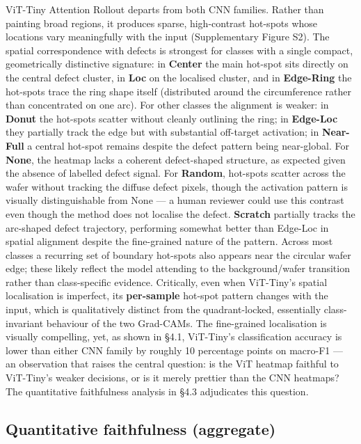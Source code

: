 \documentclass[11pt,a4paper]{article}
\begin{document}
ViT-Tiny Attention Rollout departs from both CNN families. Rather than painting broad regions, it produces sparse, high-contrast hot-spots whose locations vary meaningfully with the input (Supplementary Figure S2). The spatial correspondence with defects is strongest for classes with a single compact, geometrically distinctive signature: in \textbf{Center} the main hot-spot sits directly on the central defect cluster, in \textbf{Loc} on the localised cluster, and in \textbf{Edge-Ring} the hot-spots trace the ring shape itself (distributed around the circumference rather than concentrated on one arc). For other classes the alignment is weaker: in \textbf{Donut} the hot-spots scatter without cleanly outlining the ring; in \textbf{Edge-Loc} they partially track the edge but with substantial off-target activation; in \textbf{Near-Full} a central hot-spot remains despite the defect pattern
being near-global. For \textbf{None}, the heatmap lacks a coherent defect-shaped structure, as expected given the absence of labelled defect signal. For \textbf{Random}, hot-spots scatter across the wafer without tracking the diffuse defect pixels, though the activation pattern is visually distinguishable from None --- a human reviewer could use this contrast even though the method does not localise the defect. \textbf{Scratch} partially tracks the arc-shaped defect trajectory, performing somewhat better than Edge-Loc in spatial alignment despite the fine-grained nature of the pattern. Across most classes a recurring set of boundary hot-spots also appears near the circular wafer edge; these likely reflect the model attending to the background/wafer transition rather than class-specific evidence. Critically, even when ViT-Tiny's spatial localisation is imperfect, its \textbf{per-sample}
hot-spot pattern changes with the input, which is qualitatively distinct from the quadrant-locked, essentially class-invariant behaviour of the two Grad-CAMs. The fine-grained localisation is visually compelling, yet, as shown in \S{}4.1, ViT-Tiny's classification accuracy is lower than either CNN family by roughly 10 percentage points on macro-F1 --- an observation that raises the central question: is the ViT heatmap faithful to ViT-Tiny's weaker decisions, or is it merely prettier than the CNN heatmaps? The quantitative faithfulness analysis in \S{}4.3 adjudicates this question.


\subsection{Quantitative faithfulness (aggregate)}
\end{document}
